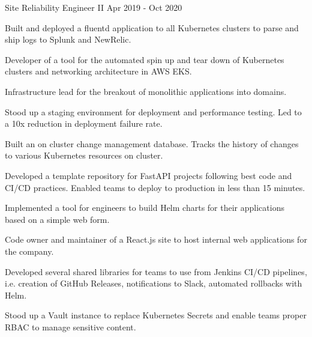 \begin{cventries}
  \cventry
    {Site Reliability Engineer II} %
    {} %
    {} %
    {Apr 2019 - Oct 2020} %
    {
      \begin{cvitems} %
        \item {Built and deployed a fluentd application to all Kubernetes clusters to parse and ship logs to Splunk and NewRelic.}
        \item {Developer of a tool for the automated spin up and tear down of Kubernetes clusters and networking architecture in AWS EKS.}
        \item {Infrastructure lead for the breakout of monolithic applications into domains.}
        \item {Stood up a staging environment for deployment and performance testing. Led to a 10x reduction in deployment failure rate.}
        \item {Built an on cluster change management database. Tracks the history of changes to various Kubernetes resources on cluster.}
        \item {Developed a template repository for FastAPI projects following best code and CI/CD practices. Enabled teams to deploy to production in less than 15 minutes.}
        \item {Implemented a tool for engineers to build Helm charts for their applications based on a simple web form.}
        \item {Code owner and maintainer of a React.js site to host internal web applications for the company.}
        \item {Developed several shared libraries for teams to use from Jenkins CI/CD pipelines, i.e. creation of GitHub Releases, notifications to Slack, automated rollbacks with Helm.}
        \item {Stood up a Vault instance to replace Kubernetes Secrets and enable teams proper RBAC to manage sensitive content.}
      \end{cvitems}
    }



\end{cventries}
